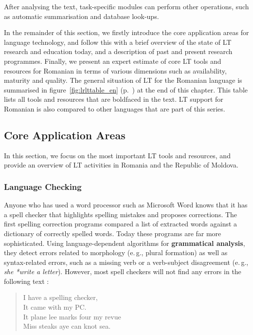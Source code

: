 \begin{multicols}{2}
After analysing the text, task-specific modules can perform other operations, such as automatic summarisation and database look-ups.

In the remainder of this section, we firstly introduce the core application areas for language technology, and follow this with a brief overview of the state of LT research and education today, and a description of past and present research programmes. Finally, we present an expert estimate of core LT tools and resources for Romanian in terms of various dimensions such as availability, maturity and quality. The general situation of LT for the Romanian language is summarised in figure~\ref{fig:lrlttable_en} (p.~\pageref{fig:lrlttable_en}) at the end of this chapter. This table lists all tools and resources that are boldfaced in the text. LT support for Romanian is also compared to other languages that are part of this series.

\subsection{Core Application Areas}

In this section, we focus on the most important LT tools and resources, and provide an overview of LT activities in Romania and the Republic of Moldova. 

\subsubsection{Language Checking}

Anyone who has used a word processor such as Microsoft Word knows that it has a spell checker that highlights spelling mistakes and proposes corrections. The first spelling correction programs compared a list of extracted words against a dictionary of correctly spelled words. Today these programs are far more sophisticated. Using language-dependent algorithms for \textbf{grammatical analysis}, they detect errors related to morphology (e.\,g., plural formation) as well as syntax-related errors, such as a missing verb or a verb-subject disagreement (e.\,g., \textit{she *write a letter}). However, most spell checkers will not find any errors in the following text \cite{zar1}:

\begin{quote}
  I have a spelling checker,\\
  It came with my PC.\\
  It plane lee marks four my revue\\
  Miss steaks aye can knot sea.
\end{quote}


\end{multicols}
